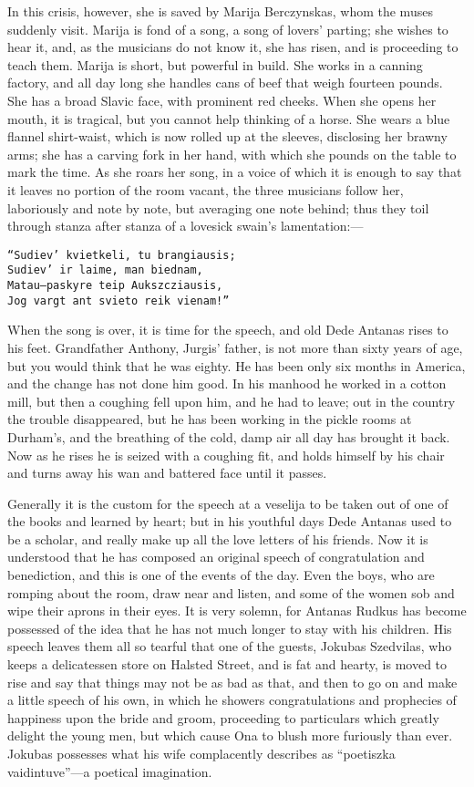 \documentclass[
]{article}
\begin{document}
In this crisis, however, she is saved by Marija Berczynskas, whom the muses suddenly visit. Marija is fond of a song, a song of lovers' parting; she wishes to hear it, and, as the musicians do not know it, she has risen, and is proceeding to teach them. Marija is short, but powerful in build. She works in a canning factory, and all day long she handles cans of beef that weigh fourteen pounds. She has a broad Slavic face, with prominent red cheeks. When she opens her mouth, it is tragical, but you cannot help thinking of a horse. She wears a blue flannel shirt-waist, which is now rolled up at the sleeves, disclosing her brawny arms; she has a carving fork in her hand, with which she pounds on the table to mark the time. As she roars her song, in a voice of which it is enough to say that it leaves no portion of the room vacant, the three musicians follow her, laboriously and note by note, but averaging one note behind; thus they toil through stanza after stanza of a lovesick swain's lamentation:---

\begin{verbatim}
“Sudiev’ kvietkeli, tu brangiausis;
Sudiev’ ir laime, man biednam,
Matau—paskyre teip Aukszcziausis,
Jog vargt ant svieto reik vienam!”
\end{verbatim}

When the song is over, it is time for the speech, and old Dede Antanas rises to his feet. Grandfather Anthony, Jurgis' father, is not more than sixty years of age, but you would think that he was eighty. He has been only six months in America, and the change has not done him good. In his manhood he worked in a cotton mill, but then a coughing fell upon him, and he had to leave; out in the country the trouble disappeared, but he has been working in the pickle rooms at Durham's, and the breathing of the cold, damp air all day has brought it back. Now as he rises he is seized with a coughing fit, and holds himself by his chair and turns away his wan and battered face until it passes.

Generally it is the custom for the speech at a veselija to be taken out of one of the books and learned by heart; but in his youthful days Dede Antanas used to be a scholar, and really make up all the love letters of his friends. Now it is understood that he has composed an original speech of congratulation and benediction, and this is one of the events of the day. Even the boys, who are romping about the room, draw near and listen, and some of the women sob and wipe their aprons in their eyes. It is very solemn, for Antanas Rudkus has become possessed of the idea that he has not much longer to stay with his children. His speech leaves them all so tearful that one of the guests, Jokubas Szedvilas, who keeps a delicatessen store on Halsted Street, and is fat and hearty, is moved to rise and say that things may not be as bad as that, and then to go on and make a little speech of his own, in which he showers congratulations and prophecies of happiness upon the bride and groom, proceeding to particulars which greatly delight the young men, but which cause Ona to blush more furiously than ever. Jokubas possesses what his wife complacently describes as ``poetiszka vaidintuve''---a poetical imagination.
\end{document}
